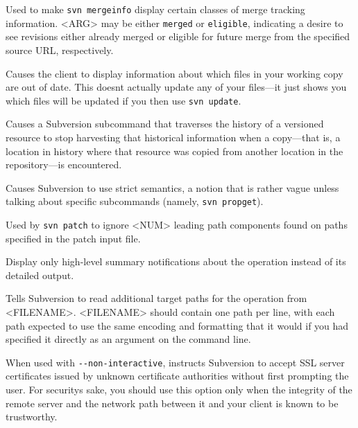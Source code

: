 \begin{description}
Used to make \texttt{svn\ mergeinfo} display certain classes of merge
tracking information. \textless ARG\textgreater{} may be either
\texttt{merged} or \texttt{eligible}, indicating a desire to see
revisions either already merged or eligible for future merge from the
specified source URL, respectively.
\item[\protect\phantomsection\label{svn.ref.svn.sw.show_updates}{}\texttt{-\/-show-updates}
(\texttt{-u})]
Causes the client to display information about which files in your
working copy are out of date. This doesn\textquotesingle t actually
update any of your files---it just shows you which files will be updated
if you then use \texttt{svn\ update}.
\item[\protect\phantomsection\label{svn.ref.svn.sw.stop_on_copy}{}\texttt{-\/-stop-on-copy}]
Causes a Subversion subcommand that traverses the history of a versioned
resource to stop harvesting that historical information when a
copy---that is, a location in history where that resource was copied
from another location in the repository---is encountered.
\item[\protect\phantomsection\label{svn.ref.svn.sw.strict}{}\texttt{-\/-strict}]
Causes Subversion to use strict semantics, a notion that is rather vague
unless talking about specific subcommands (namely,
\texttt{svn\ propget}).
\item[\protect\phantomsection\label{svn.ref.svn.sw.strip}{}\texttt{-\/-strip}
\textless NUM\textgreater{}]
Used by \texttt{svn\ patch} to ignore \textless NUM\textgreater{}
leading path components found on paths specified in the patch input
file.
\item[\protect\phantomsection\label{svn.ref.svn.sw.summarize}{}\texttt{-\/-summarize}]
Display only high-level summary notifications about the operation
instead of its detailed output.
\item[\protect\phantomsection\label{svn.ref.svn.sw.targets}{}\texttt{-\/-targets}
\textless FILENAME\textgreater{}]
Tells Subversion to read additional target paths for the operation from
\textless FILENAME\textgreater. \textless FILENAME\textgreater{} should
contain one path per line, with each path expected to use the same
encoding and formatting that it would if you had specified it directly
as an argument on the command line.
\item[\protect\phantomsection\label{svn.ref.svn.sw.trust_server_cert}{}\texttt{-\/-trust-server-cert}]
When used with \texttt{-\/-non-interactive}, instructs Subversion to
accept SSL server certificates issued by unknown certificate authorities
without first prompting the user. For security\textquotesingle s sake,
you should use this option only when the integrity of the remote server
and the network path between it and your client is known to be
trustworthy.


\end{description}

